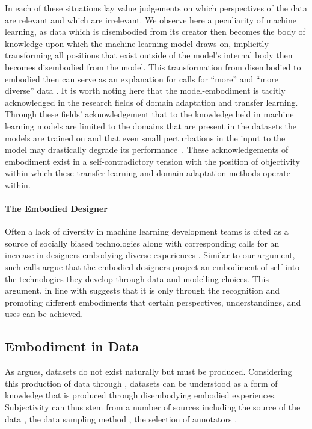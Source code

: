 In each of these situations lay value judgements on which perspectives of the data are relevant and which are irrelevant. We observe here a peculiarity of machine learning, as data which is disembodied from its creator then becomes the body of knowledge upon which the machine learning model draws on, implicitly transforming all positions that exist outside of the model's internal body then becomes disembodied from the model. This transformation from disembodied to embodied then can serve as an explanation for calls for ``more'' and ``more diverse'' data \cite{Holstein:2019}.
It is worth noting here that the model-embodiment is tacitly acknowledged in the research fields of domain adaptation \cite{Daume:2007} and transfer learning. Through these fields' acknowledgement that to the knowledge held in machine learning models are limited to the domains that are present in the datasets the models are trained on and that even small perturbations in the input to the model may drastically degrade its performance~\cite{Szegedy:2014,Daume:2007}. These acknowledgements of embodiment exist in a self-contradictory tension with the position of objectivity within which these transfer-learning and domain adaptation methods operate within.

\paragraph{The Embodied Designer}
Often a lack of diversity in machine learning development teams is cited as a source of socially biased technologies along with corresponding calls for an increase in designers embodying diverse experiences \cite{West:2019}. Similar to our argument, such calls argue that the embodied designers project an embodiment of self into the technologies they develop through data and modelling choices. This argument, in line with \citet{Haraway:1988} suggests that it is only through the recognition and promoting different embodiments that certain perspectives, understandings, and uses can be achieved.

\subsection{Embodiment in Data}
As \citet{Gitelman:2013} argues, datasets do not exist naturally but must be produced. Considering this production of data through \citet{Haraway:1988}, datasets can be understood as a form of knowledge that is produced through disembodying embodied experiences. Subjectivity can thus stem from a number of sources including the source of the data \cite{Gitelman-Jackson:2013}, the data sampling method \cite{Shah:2020}, the selection of annotators \cite{Waseem:2016,Derczynski:2016}.

